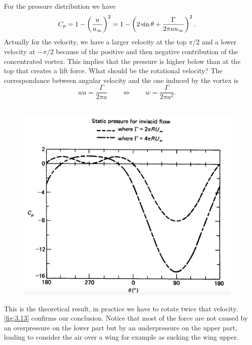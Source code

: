 	For the pressure distribution we have 
	\begin{equation}
		C_p = 1-\left( \frac{u}{u_\infty} \right)^2 = 1 - \left(2\sin \theta + \frac{\Gamma}{2\pi au_\infty} \right) ^2.
	\end{equation}
	Actually for the velocity, we have a larger velocity at the top $\pi/2$ and a lower velocity at $-\pi /2$ because of the positive and then negative contribution of the concentrated vortex. This implies that the pressure is higher below than at the top that creates a lift force. What should be the rotational velocity? The correspondance between angular velocity and the one induced by the vortex is
	\begin{equation}
		wa = \frac{\Gamma}{2\pi a} \qquad \Leftrightarrow	\qquad w = \frac{\Gamma}{2\pi a^2}.
	\end{equation}
	\ \\ 
	\begin{figure}
	\vspace{-15mm}	
	\includegraphics[scale=0.2]{ch3/13}	
	\label{fig:3.13}
	\end{figure}
	This is the theoretical result, in practice we have to rotate twice that velocity. \autoref{fig:3.13} confirms our conclusion. Notice that most of the force are not caused by an overpressure on the lower part but by an underpressure on the upper part, leading to consider the air over a wing for example as sucking the wing upper. 